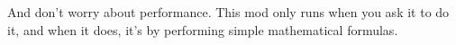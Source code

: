 \documentclass[11pt]{article}
\newcommand{\code}[1]{\small\texttt{#1}}
\newlength{\argdesc}
\begin{document}
And don't worry about performance. This mod only runs when you ask it to do it, and when it does, it's by performing simple mathematical formulas.

 







\end{document}
